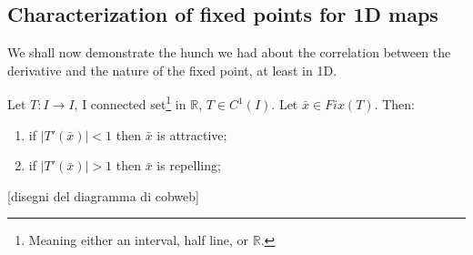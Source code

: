\subsection{Characterization of fixed points for 1D maps}
We shall now demonstrate the hunch we had about the correlation between the derivative and the nature of the fixed point, at least in 1D.
\begin{proposition}
    Let $T:I\rightarrow I$, I connected set\footnote{Meaning either an interval, half line, or $\mathbb{R}.$} in $\mathbb{R}$, $T\in C^1(I)$. Let $\bar{x}\in Fix(T)$. Then:
    \begin{enumerate}
        \item if $|T'(\bar{x})|<1$ then $\bar{x}$ is attractive;
        \item if $|T'(\bar{x})|>1$ then $\bar{x}$ is repelling; 
    \end{enumerate}
    [disegni del diagramma di cobweb]
\end{proposition}
